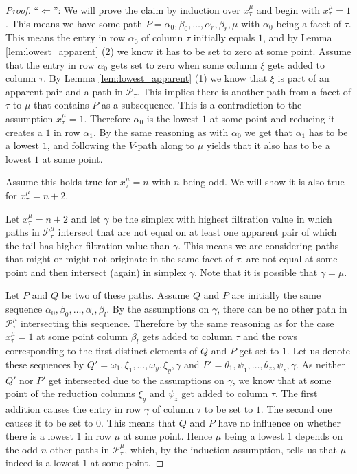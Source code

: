 \begin{proof}
\enquote{$\Leftarrow$}: We will prove the claim by induction over $x_\tau^\mu$ and begin with $x_\tau^\mu = 1$. This means we have some path $P = \alpha_0, \beta_0, \dots, \alpha_r, \beta_r, \mu$ with $\alpha_0$ being a facet of $\tau$. This means the entry in row $\alpha_0$ of column $\tau$ initially equals $1$, and by Lemma \ref{lem:lowest_apparent} (2) we know it has to be set to zero at some point. Assume that the entry in row $\alpha_0$ gets set to zero when some column $\xi$ gets added to column $\tau$. By Lemma \ref{lem:lowest_apparent} (1) we know that $\xi$ is part of an apparent pair and a path in $\mathcal{P}_\tau$. This implies there is another path from a facet of $\tau$ to $\mu$ that contains $P$ as a subsequence. This is a contradiction to the assumption $x_\tau^\mu = 1$. Therefore $\alpha_0$ is the lowest $1$ at some point and reducing it creates a $1$ in row $\alpha_1$. By the same reasoning as with $\alpha_0$ we get that $\alpha_1$ has to be a lowest $1$, and following the $V$-path along to $\mu$ yields that it also has to be a lowest $1$ at some point. 

Assume this holds true for $x_\tau^\mu = n$ with $n$ being odd. We will show it is also true for $x_\tau^\mu = n+2$. 

Let $x_\tau^\mu = n+2$ and let $\gamma$ be the simplex with highest filtration value in which paths in $\mathcal{P}_\tau^\mu$ intersect that are not equal on at least one apparent pair of which the tail has higher filtration value than $\gamma$. This means we are considering paths that might or might not originate in the same facet of $\tau$, are not equal at some point and then intersect (again) in simplex $\gamma$. Note that it is possible that $\gamma = \mu$.

Let $P$ and $Q$ be two of these paths. Assume $Q$ and $P$ are initially the same sequence $\alpha_0,\beta_0, \dots, \alpha_l,\beta_l$. By the assumptions on $\gamma$, there can be no other path in $\mathcal{P}_\tau^\mu$ intersecting this sequence. Therefore by the same reasoning as for the case $x_\tau^\mu = 1$ at some point column  $\beta_l$ gets added to column $\tau$ and the rows corresponding to the first distinct elements of $Q$ and $P$ get set to $1$. Let us denote these sequences by $Q' = \omega_1, \xi_1, \dots, \omega_y, \xi_y, \gamma$ and $P' = \theta_1, \psi_1, \dots, \theta_z, \psi_z, \gamma$. As neither $Q'$ nor $P'$ get intersected due to the assumptions on $\gamma$, we know that at some point of the reduction columns $\xi_y$ and $\psi_z$ get added to column $\tau$. The first addition causes the entry in row $\gamma$ of column $\tau$ to be set to $1$. The second one causes it to be set to $0$. This means that $Q$ and $P$ have no influence on whether there is a lowest $1$ in row $\mu$ at some point. Hence $\mu$ being a lowest $1$ depends on the odd $n$ other paths in $\mathcal{P}_\tau^\mu$, which, by the induction assumption, tells us that $\mu$ indeed is a lowest $1$ at some point.
\end{proof}

